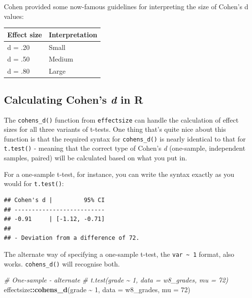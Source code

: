 \documentclass[
]{book}
\newenvironment{Shaded}{\begin{snugshade}}{\end{snugshade}}
\newcommand{\AttributeTok}[1]{\textcolor[rgb]{0.13,0.29,0.53}{#1}}
\newcommand{\CommentTok}[1]{\textcolor[rgb]{0.56,0.35,0.01}{\textit{#1}}}
\newcommand{\DecValTok}[1]{\textcolor[rgb]{0.00,0.00,0.81}{#1}}
\newcommand{\FunctionTok}[1]{\textcolor[rgb]{0.13,0.29,0.53}{\textbf{#1}}}
\newcommand{\NormalTok}[1]{#1}
\newcommand{\SpecialCharTok}[1]{\textcolor[rgb]{0.81,0.36,0.00}{\textbf{#1}}}
\begin{document}
Cohen provided some now-famous guidelines for interpreting the size of Cohen's d values:

\begin{tabular}{l|l}
\hline
Effect size & Interpretation\\
\hline
d = .20 & Small\\
\hline
d = .50 & Medium\\
\hline
d = .80 & Large\\
\hline
\end{tabular}

\hypertarget{calculating-cohens-d-in-r}{%
\subsection{\texorpdfstring{Calculating Cohen's \emph{d} in R}{Calculating Cohen's d in R}}\label{calculating-cohens-d-in-r}}

The \texttt{cohens\_d()} function from \texttt{effectsize} can handle the calculation of effect sizes for all three variants of t-tests. One thing that's quite nice about this function is that the required syntax for \texttt{cohens\_d()} is nearly identical to that for \texttt{t.test()} - meaning that the correct type of Cohen's \emph{d} (one-sample, independent samples, paired) will be calculated based on what you put in.

For a one-sample t-test, for instance, you can write the syntax exactly as you would for \texttt{t.test()}:

\begin{Shaded}
\end{Shaded}

\begin{verbatim}
## Cohen's d |         95% CI
## --------------------------
## -0.91     | [-1.12, -0.71]
## 
## - Deviation from a difference of 72.
\end{verbatim}

The alternate way of specifying a one-sample t-test, the \texttt{var\ \textasciitilde{}\ 1} format, also works. \texttt{cohens\_d()} will recognise both.

\begin{Shaded}
\begin{Highlighting}[]
\CommentTok{\# One{-}sample {-} alternate}
\CommentTok{\# t.test(grade \textasciitilde{} 1, data = w8\_grades, mu = 72)}
\NormalTok{effectsize}\SpecialCharTok{::}\FunctionTok{cohens\_d}\NormalTok{(grade }\SpecialCharTok{\textasciitilde{}} \DecValTok{1}\NormalTok{, }\AttributeTok{data =}\NormalTok{ w8\_grades, }\AttributeTok{mu =} \DecValTok{72}\NormalTok{)}
\end{Highlighting}
\end{Shaded}
\end{document}

